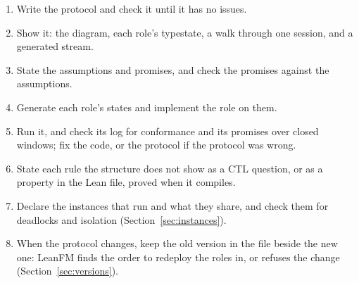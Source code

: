 \begin{enumerate}
  \item Write the protocol and check it until it has no issues.
  \item Show it: the diagram, each role's typestate, a walk through one session,
        and a generated stream.
  \item State the assumptions and promises, and check the promises against the
        assumptions.
  \item Generate each role's states and implement the role on them.
  \item Run it, and check its log for conformance and its promises over closed
        windows; fix the code, or the protocol if the protocol was wrong.
  \item State each rule the structure does not show as a CTL question, or as a
        property in the Lean file, proved when it compiles.
  \item Declare the instances that run and what they share, and check them for
        deadlocks and isolation (Section~\ref{sec:instances}).
  \item When the protocol changes, keep the old version in the file beside the
        new one: LeanFM finds the order to redeploy the roles in, or refuses the
        change (Section~\ref{sec:versions}).
\end{enumerate}
